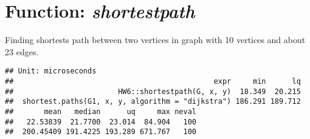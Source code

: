 \documentclass[pdftex,12pt]{article}\usepackage[]{graphicx}\usepackage[]{color}
\makeatletter
\newenvironment{kframe}{%
 \def\at@end@of@kframe{}%
 \ifinner\ifhmode%
  \def\at@end@of@kframe{\end{minipage}}%
  \begin{minipage}{\columnwidth}%
 \fi\fi%
 \def\FrameCommand##1{\hskip\@totalleftmargin \hskip-\fboxsep
 \colorbox{shadecolor}{##1}\hskip-\fboxsep
     \hskip-\linewidth \hskip-\@totalleftmargin \hskip\columnwidth}%
 \MakeFramed {\advance\hsize-\width
   \@totalleftmargin\z@ \linewidth\hsize
   \@setminipage}}%
 {\par\unskip\endMakeFramed%
 \at@end@of@kframe}
\newenvironment{knitrout}{}{} %
\makeatother
\begin{document}
\section{Function: \emph{shortestpath}}
Finding shortests path between two vertices in graph with 10 vertices and about 23 edges.
\begin{knitrout}
\color{fgcolor}\begin{kframe}
\begin{verbatim}
## Unit: microseconds
##                                              expr     min      lq
##                        HW6::shortestpath(G, x, y)  18.349  20.215
##  shortest.paths(G1, x, y, algorithm = "dijkstra") 186.291 189.712
##       mean   median      uq     max neval
##   22.53839  21.7700  23.014  84.904   100
##  200.45409 191.4225 193.289 671.767   100
\end{verbatim}
\end{kframe}
\end{knitrout}
\end{document}
